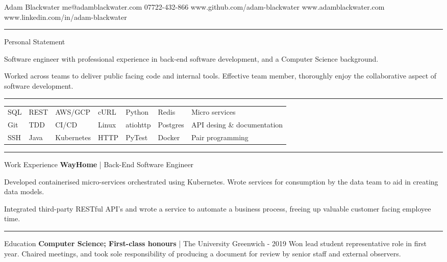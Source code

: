 \documentclass[12pt,twoside]{article}
\begin{document}
\topheading
    {Adam Blackwater}
    {me@adamblackwater.com}
    {07722-432-866}
    {www.github.com/adam-blackwater}
    {www.adamblackwater.com}
    {www.linkedin.com/in/adam-blackwater}

\vspace{1.0em}
\hrule
\vspace{1.2em}

\statement
    {Personal Statement}
    {
        Software engineer with professional experience in back-end software
        development, and a Computer Science background. 

        \hspace{1.5em}Worked across teams to deliver public facing code and
        internal tools. Effective team member, thoroughly enjoy the
        collaborative aspect of software development.
    }

\vspace{1.2em}
\hrule
\vspace{1.2em}

\begin{center}
    \begin{tabular}{l l l l l l l}
        SQL & REST & AWS/GCP & cURL & Python & Redis & Micro services \\
        Git & TDD & CI/CD & Linux & atiohttp & Postgres & API desing \& documentation \\
        SSH & Java & Kubernetes & HTTP & PyTest& Docker & Pair programming
    \end{tabular}
\end{center}

\vspace{0.4em}
\hrule
\vspace{1.2em}

\headedsection
    {Work Experience}
    {
        \textbf{WayHome} | Back-End Software Engineer}
    {
        Developed containerised micro-services orchestrated using Kubernetes. Wrote
        services for consumption by the data team to aid in creating data models.

        \hspace{1.5em}Integrated third-party RESTful API's and wrote a service to
        automate a business process, freeing up valuable customer facing
        employee time.
    }

\vspace{1.2em}
\hrule
\vspace{1.2em}

\headedsection
    {Education}
    {
        \textbf{Computer Science; First-class honours} | The University
        Greenwich - 2019
    }
    {
        Won lead student representative role in first year. Chaired meetings,
        and took sole responsibility of producing a document for review by
        senior staff and external observers.
    }
\end{document}
